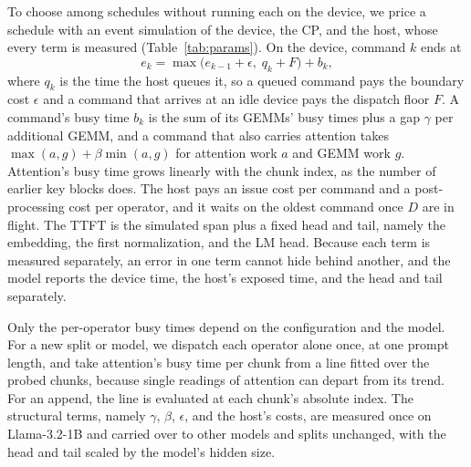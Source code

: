 To choose among schedules without running each on the device, we price a schedule with an event simulation of the device, the CP, and the host, whose every term is measured (Table~\ref{tab:params}).
On the device, command $k$ ends at
\begin{equation}
\label{eq:cmd}
e_k = \max\bigl(e_{k-1} + \epsilon,\; q_k + F\bigr) + b_k,
\end{equation}
where $q_k$ is the time the host queues it, so a queued command pays the boundary cost $\epsilon$ and a command that arrives at an idle device pays the dispatch floor $F$.
A command's busy time $b_k$ is the sum of its GEMMs' busy times plus a gap $\gamma$ per additional GEMM, and a command that also carries attention takes $\max(a, g) + \beta \min(a, g)$ for attention work $a$ and GEMM work $g$.
Attention's busy time grows linearly with the chunk index, as the number of earlier key blocks does.
The host pays an issue cost per command and a post-processing cost per operator, and it waits on the oldest command once $D$ are in flight.
The TTFT is the simulated span plus a fixed head and tail, namely the embedding, the first normalization, and the LM head.
Because each term is measured separately, an error in one term cannot hide behind another, and the model reports the device time, the host's exposed time, and the head and tail separately.

Only the per-operator busy times depend on the configuration and the model.
For a new split or model, we dispatch each operator alone once, at one prompt length, and take attention's busy time per chunk from a line fitted over the probed chunks, because single readings of attention can depart from its trend.
For an append, the line is evaluated at each chunk's absolute index.
The structural terms, namely $\gamma$, $\beta$, $\epsilon$, and the host's costs, are measured once on Llama-3.2-1B and carried over to other models and splits unchanged, with the head and tail scaled by the model's hidden size.

